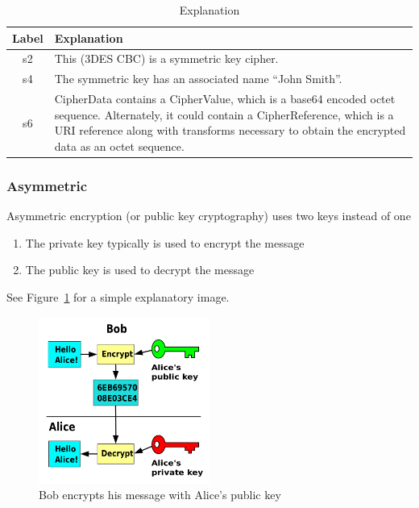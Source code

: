 \begin{table}
    \begin{tabulary}{\textwidth}{cL}
        \toprule
        Label & Explanation \\
        \midrule
        s2 & This (3DES CBC) is a symmetric key cipher. \\

        s4 & The symmetric key has an associated name “John Smith”. \\

        s6 & CipherData contains a CipherValue, which is a base64 encoded octet
        sequence. Alternately, it could contain a CipherReference, which is a
        URI reference along with transforms necessary to obtain the encrypted
        data as an octet sequence. \\
        \bottomrule
    \end{tabulary}
    \caption{Explanation}
\end{table}

\subsubsection{Asymmetric}
Asymmetric encryption (or public key cryptography) uses two keys instead of one

\begin{enumerate}
    \item The private key typically is used to encrypt the message
    \item The public key is used to decrypt the message
\end{enumerate}
See Figure~\ref{fig:public_key} for a simple explanatory image.

\begin{figure}
    \center{}
    \includegraphics[width=0.5\textwidth]{public_key}
    \caption{Bob encrypts his message with Alice's public
    key}\label{fig:public_key}
\end{figure}

